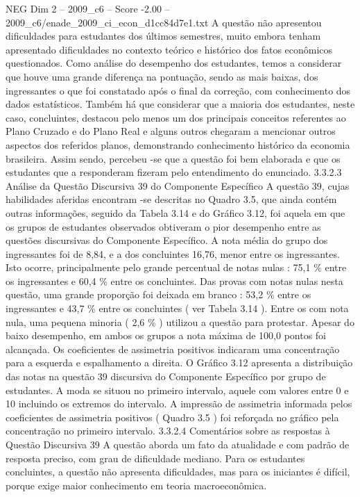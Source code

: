 \begin{textsample}{NEG Dim 2 – 2009\_c6 – Score -2.00 – 2009\_c6/enade\_2009\_ci\_econ\_d1cc84d7e1.txt}
A questão não apresentou dificuldades para estudantes dos últimos semestres, muito embora tenham apresentado dificuldades no contexto teórico e histórico dos fatos econômicos questionados.
Como análise do desempenho dos estudantes, temos a considerar que houve uma grande diferença na pontuação, sendo as mais baixas, dos ingressantes o que foi constatado após o final da correção, com conhecimento dos dados estatísticos.
Também há que considerar que a maioria dos estudantes, neste caso, concluintes, destacou pelo menos um dos principais conceitos referentes ao Plano Cruzado e do Plano Real e alguns outros chegaram a mencionar outros aspectos dos referidos planos, demonstrando conhecimento histórico da economia brasileira.
Assim sendo, percebeu -se que a questão foi bem elaborada e que os estudantes que a responderam fizeram pelo entendimento do enunciado. 3.3.2.3 Análise da Questão Discursiva 39 do Componente Específico A questão 39, cujas habilidades aferidas encontram -se descritas no Quadro 3.5, que ainda contém outras informações, seguido da Tabela 3.14 e do Gráfico 3.12, foi aquela em que os grupos de estudantes observados obtiveram o pior desempenho entre as questões discursivas do Componente Específico.
A nota média do grupo dos ingressantes foi de 8,84, e a dos concluintes 16,76, menor entre os ingressantes.
Isto ocorre, principalmente pelo grande percentual de notas nulas : 75,1 \% entre os ingressantes e 60,4 \% entre os concluintes.
Das provas com notas nulas nesta questão, uma grande proporção foi deixada em branco : 53,2 \% entre os ingressantes e 43,7 \% entre os concluintes ( ver Tabela 3.14 ).
Entre os com nota nula, uma pequena minoria ( 2,6 \% ) utilizou a questão para protestar.
Apesar do baixo desempenho, em ambos os grupos a nota máxima de 100,0 pontos foi alcançada.
Os coeficientes de assimetria positivos indicaram uma concentração para a esquerda e espalhamento a direita.
O Gráfico 3.12 apresenta a distribuição das notas na questão 39 discursiva do Componente Específico por grupo de estudantes.
A moda se situou no primeiro intervalo, aquele com valores entre 0 e 10 incluindo os extremos do intervalo.
A impressão de assimetria informada pelos coeficientes de assimetria positivos ( Quadro 3.5 ) foi reforçada no gráfico pela concentração no primeiro intervalo. 3.3.2.4 Comentários sobre as respostas à Questão Discursiva 39 A questão aborda um fato da atualidade e com padrão de resposta preciso, com grau de dificuldade mediano.
Para os estudantes concluintes, a questão não apresenta dificuldades, mas para os iniciantes é difícil, porque exige maior conhecimento em teoria macroeconômica.

\end{textsample}
